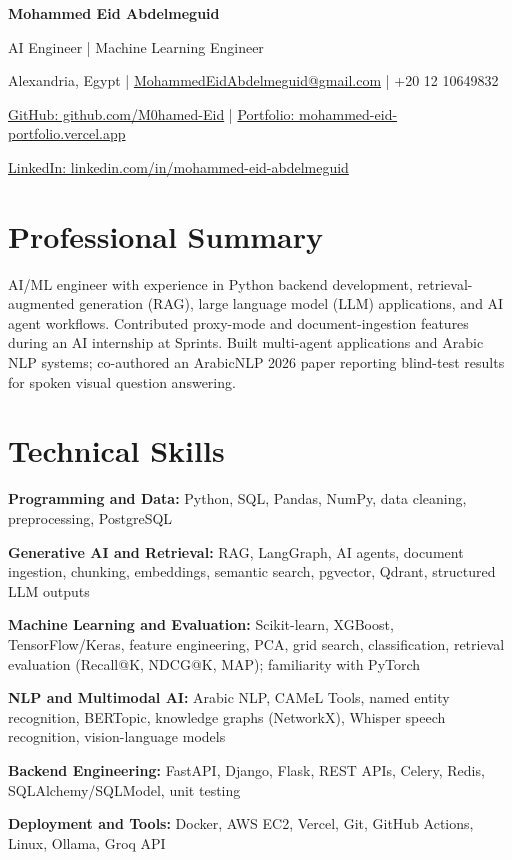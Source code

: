 \documentclass[11pt,letterpaper]{article}
\begin{document}
{\fontsize{24}{27}\selectfont\bfseries\color{primaryColor} Mohammed Eid Abdelmeguid}\par
\vspace{4pt}
{\large AI Engineer | Machine Learning Engineer}\par
\vspace{4pt}
Alexandria, Egypt | \href{mailto:MohammedEidAbdelmeguid@gmail.com}{MohammedEidAbdelmeguid@gmail.com} | +20 12 10649832\par
\href{https://github.com/M0hamed-Eid}{GitHub: github.com/M0hamed-Eid} | \href{https://mohammed-eid-portfolio.vercel.app}{Portfolio: mohammed-eid-portfolio.vercel.app}\par
\href{https://linkedin.com/in/mohammed-eid-abdelmeguid}{LinkedIn: linkedin.com/in/mohammed-eid-abdelmeguid}\par

\section{Professional Summary}
AI/ML engineer with experience in Python backend development, retrieval-augmented generation (RAG), large language model (LLM) applications, and AI agent workflows. Contributed proxy-mode and document-ingestion features during an AI internship at Sprints. Built multi-agent applications and Arabic NLP systems; co-authored an ArabicNLP 2026 paper reporting blind-test results for spoken visual question answering.

\section{Technical Skills}
\textbf{Programming and Data:} Python, SQL, Pandas, NumPy, data cleaning, preprocessing, PostgreSQL\par
\textbf{Generative AI and Retrieval:} RAG, LangGraph, AI agents, document ingestion, chunking, embeddings, semantic search, pgvector, Qdrant, structured LLM outputs\par
\textbf{Machine Learning and Evaluation:} Scikit-learn, XGBoost, TensorFlow/Keras, feature engineering, PCA, grid search, classification, retrieval evaluation (Recall@K, NDCG@K, MAP); familiarity with PyTorch\par
\textbf{NLP and Multimodal AI:} Arabic NLP, CAMeL Tools, named entity recognition, BERTopic, knowledge graphs (NetworkX), Whisper speech recognition, vision-language models\par
\textbf{Backend Engineering:} FastAPI, Django, Flask, REST APIs, Celery, Redis, SQLAlchemy/SQLModel, unit testing\par
\textbf{Deployment and Tools:} Docker, AWS EC2, Vercel, Git, GitHub Actions, Linux, Ollama, Groq API\par
\end{document}
